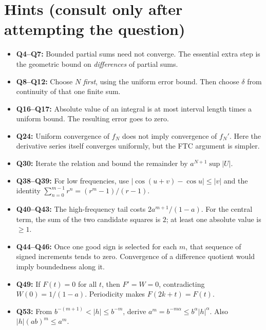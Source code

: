 \documentclass{workbook}
\newcounter{question}
\begin{document}
\section{Hints (consult only after attempting the question)}
\begin{itemize}[leftmargin=*]
\item \textbf{Q4--Q7:} Bounded partial sums need not converge. The essential extra step is the geometric bound on \emph{differences} of partial sums.
\item \textbf{Q8--Q12:} Choose $N$ \emph{first}, using the uniform error bound. Then choose $\delta$ from continuity of that one finite sum.
\item \textbf{Q16--Q17:} Absolute value of an integral is at most interval length times a uniform bound. The resulting error goes to zero.
\item \textbf{Q24:} Uniform convergence of $f_N$ does not imply convergence of $f_N'$. Here the derivative series itself converges uniformly, but the FTC argument is simpler.
\item \textbf{Q30:} Iterate the relation and bound the remainder by $a^{N+1}\sup |U|$.
\item \textbf{Q38--Q39:} For low frequencies, use $|\cos(u+v)-\cos u|\leq|v|$ and the identity $\sum_{n=0}^{m-1}r^n=(r^m-1)/(r-1)$.
\item \textbf{Q40--Q43:} The high-frequency tail costs $2a^{m+1}/(1-a)$. For the central term, the sum of the two candidate squares is $2$; at least one absolute value is $\geq1$.
\item \textbf{Q44--Q46:} Once one good sign is selected for each $m$, that sequence of signed increments tends to zero. Convergence of a difference quotient would imply boundedness along it.
\item \textbf{Q49:} If $F(t)=0$ for all $t$, then $F'=W=0$, contradicting $W(0)=1/(1-a)$. Periodicity makes $F(2k+t)=F(t)$.
\item \textbf{Q53:} From $b^{-(m+1)}<|h|\leq b^{-m}$, derive $a^m=b^{-m\alpha}\leq b^\alpha|h|^\alpha$. Also $|h|(ab)^m\leq a^m$.
\end{itemize}
\end{document}
